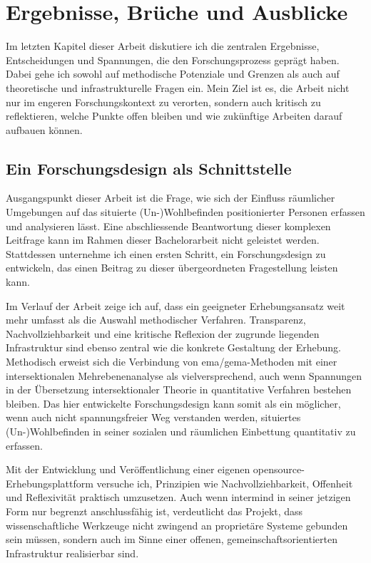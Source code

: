 \chapter{Ergebnisse, Brüche und Ausblicke} \label{sec:diskussion}

Im letzten Kapitel dieser Arbeit diskutiere ich die zentralen Ergebnisse, Entscheidungen und Spannungen, die den Forschungsprozess geprägt haben. Dabei gehe ich sowohl auf methodische Potenziale und Grenzen als auch auf theoretische und infrastrukturelle Fragen ein. Mein Ziel ist es, die Arbeit nicht nur im engeren Forschungskontext zu verorten, sondern auch kritisch zu reflektieren, welche Punkte offen bleiben und wie zukünftige Arbeiten darauf aufbauen können.

\section{Ein Forschungsdesign als Schnittstelle}

Ausgangspunkt dieser Arbeit ist die Frage, wie sich der Einfluss räumlicher Umgebungen auf das situierte (Un\nobreakdash-)Wohlbefinden  positionierter Personen erfassen und analysieren lässt. Eine abschliessende Beantwortung dieser komplexen Leitfrage kann im Rahmen dieser Bachelorarbeit nicht geleistet werden. Stattdessen unternehme ich einen ersten Schritt, ein Forschungsdesign zu entwickeln, das einen Beitrag zu dieser übergeordneten Fragestellung leisten kann.

Im Verlauf der Arbeit zeige ich auf, dass ein geeigneter Erhebungsansatz weit mehr umfasst als die Auswahl methodischer Verfahren. Transparenz, Nachvollziehbarkeit und eine kritische Reflexion der zugrunde liegenden Infrastruktur sind ebenso zentral wie die konkrete Gestaltung der Erhebung. Methodisch erweist sich die Verbindung von \gls{ema}/\gls{gema}-Methoden mit einer intersektionalen Mehrebenenanalyse als vielversprechend, auch wenn Spannungen in der Übersetzung intersektionaler Theorie in quantitative Verfahren bestehen bleiben. Das hier entwickelte Forschungsdesign kann somit als ein möglicher, wenn auch nicht spannungsfreier Weg verstanden werden, situiertes (Un\nobreakdash-)Wohlbefinden in seiner sozialen und räumlichen Einbettung quantitativ zu erfassen.

Mit der Entwicklung und Veröffentlichung einer eigenen \gls{opensource}-Erhebungsplattform versuche ich, Prinzipien wie Nachvollziehbarkeit, Offenheit und Reflexivität praktisch umzusetzen. Auch wenn \gls{intermind} in seiner jetzigen Form nur begrenzt anschlussfähig ist, verdeutlicht das Projekt, dass wissenschaftliche Werkzeuge nicht zwingend an proprietäre Systeme gebunden sein müssen, sondern auch im Sinne einer offenen, gemeinschaftsorientierten Infrastruktur realisierbar sind.

